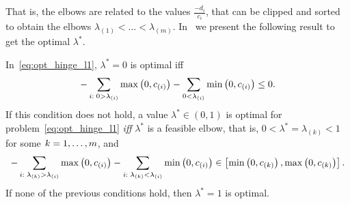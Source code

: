 That is, the elbows are related to the values $\frac{-d_i}{c_i}$, that can be clipped and sorted to obtain the elbows ${\lambda}_{(1)} < \ldots < {\lambda}_{(m)}$.
In~\citet[Proposition 2]{RuizAD21} we present the following result to get the optimal $\lambda^*$.
\begin{prop}\label{prop:hinge_neurocom2020}
    In~\eqref{eq:opt_hinge_l1}, $\lambda^*=0$ is optimal iff
    \begin{equation}
        \nonumber
        -\sum_{i:\; 0 > \lambda_{(i)}} \max\left(0, c_{(i)}\right) - \sum_{0 < \lambda_{(i)}} \min\left(0, c_{(i)}\right) \leq 0 .
        \end{equation}
        If this condition does not hold, a value $\lambda^* \in (0, 1)$ is optimal for problem~\eqref{eq:opt_hinge_l1} \emph{iff} $\lambda^*$ is a feasible elbow, that is, $0 < \lambda^* = \lambda_{(k)} < 1$ for some $k=1, \dotsc, m$, and
    \begin{equation}
        \label{eq:sol_hinge}
        -\sum_{i:\; \lambda_{(k)} > \lambda_{(i)}} \mymax{0, c_{(i)}} - \sum_{i:\; \lambda_{(k)} <\lambda_{(i)}} \mymin{0, c_{(i)}} \in \left[\mymin{0, c_{(k)}}, \mymax{0, c_{(k)}} \right] .
    \end{equation}
    If none of the previous conditions hold, then $\lambda^*=1$ is optimal.
\end{prop}
